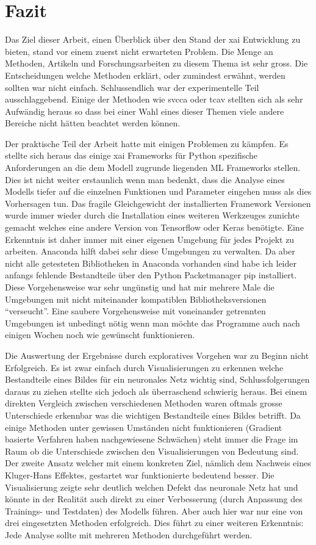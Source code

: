 \documentclass[
  12pt, %
  a4paper, %
  oneside, %
  openany, 
  numbers=noenddot, %
  BCOR=5mm, %
  parskip=half*, %
  thesis, %
]{bfhbook}
\begin{document}
\chapter{Fazit}
Das Ziel dieser Arbeit, einen Überblick über den Stand der \Gls{xai} Entwicklung zu bieten, stand vor einem zuerst nicht erwarteten Problem. Die Menge an Methoden, Artikeln und Forschungsarbeiten zu diesem Thema ist sehr gross. Die Entscheidungen welche Methoden erklärt, oder zumindest erwähnt, werden sollten war nicht einfach. Schlussendlich war der experimentelle Teil ausschlaggebend. Einige der Methoden wie \acrshort{svcca} oder \acrshort{tcav} stellten sich als sehr Aufwändig heraus so dass bei einer Wahl eines dieser Themen viele andere Bereiche nicht hätten beachtet werden können.

Der praktische Teil der Arbeit hatte mit einigen Problemen zu kämpfen. Es stellte sich heraus das einige \Gls{xai} Frameworks für Python spezifische Anforderungen an die dem Modell zugrunde liegenden \Gls{ML} Frameworks stellen. Dies ist nicht weiter erstaunlich wenn man bedenkt, dass die Analyse eines Modells tiefer auf die einzelnen Funktionen und Parameter eingehen muss als dies Vorhersagen tun. Das fragile Gleichgewicht der installierten Framework Versionen wurde immer wieder durch die Installation eines weiteren Werkzeuges zunichte gemacht welches eine andere Version von Tensorflow oder Keras benötigte. Eine Erkenntnis ist daher immer mit einer eigenen Umgebung für jedes Projekt zu arbeiten. Anaconda hilft dabei sehr diese Umgebungen zu verwalten. Da aber nicht alle getesteten Bibliotheken in Anaconda vorhanden sind habe ich leider anfangs fehlende Bestandteile über den Python Packetmanager pip installiert. Diese Vorgehensweise war sehr ungünstig und hat mir mehrere Male die Umgebungen mit nicht miteinander kompatiblen Bibliotheksversionen ``verseucht''. Eine saubere Vorgehensweise mit voneinander getrennten Umgebungen ist unbedingt nötig wenn man möchte das Programme auch nach einigen Wochen noch wie gewünscht funktionieren.

Die Auswertung der Ergebnisse durch exploratives Vorgehen war zu Beginn nicht Erfolgreich. Es ist zwar einfach durch Visualisierungen zu erkennen welche Bestandteile eines Bildes für ein neuronales Netz wichtig sind, Schlussfolgerungen daraus zu ziehen stellte sich jedoch als überraschend schwierig heraus. Bei einem direkten Vergleich zwischen verschiedenen Methoden waren oftmals grosse Unterschiede erkennbar was die wichtigen Bestandteile eines Bildes betrifft. Da einige Methoden unter gewissen Umständen nicht funktionieren (Gradient basierte Verfahren haben nachgewiesene Schwächen) steht immer die Frage im Raum ob die Unterschiede zwischen den Visualisierungen von Bedeutung sind. Der zweite Ansatz welcher mit einem konkreten Ziel, nämlich dem Nachweis eines Kluger-Hans Effektes, gestartet war funktionierte bedeutend besser. Die Visualisierung zeigte sehr deutlich welchen Defekt das neuronale Netz hat und könnte in der Realität auch direkt zu einer Verbesserung (durch Anpassung des Trainings- und Testdaten) des Modells führen. Aber auch hier war nur eine von drei eingesetzten Methoden erfolgreich. Dies führt zu einer weiteren Erkenntnis: Jede Analyse sollte mit mehreren Methoden durchgeführt werden.
\end{document}
